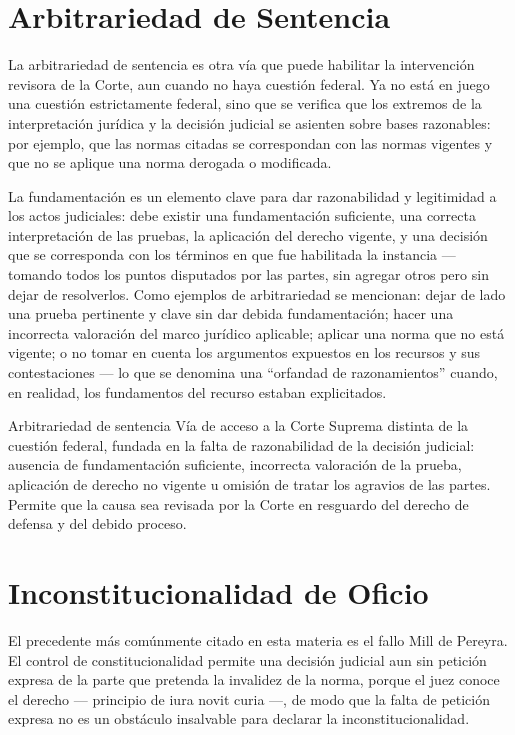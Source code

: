 \documentclass[12pt,oneside]{book}
\begin{document}
\section{Arbitrariedad de Sentencia}

La arbitrariedad de sentencia es otra vía que puede habilitar la intervención revisora de la Corte, aun cuando no haya cuestión federal. Ya no está en juego una cuestión estrictamente federal, sino que se verifica que los extremos de la interpretación jurídica y la decisión judicial se asienten sobre bases razonables: por ejemplo, que las normas citadas se correspondan con las normas vigentes y que no se aplique una norma derogada o modificada.

La fundamentación es un elemento clave para dar razonabilidad y legitimidad a los actos judiciales: debe existir una fundamentación suficiente, una correcta interpretación de las pruebas, la aplicación del derecho vigente, y una decisión que se corresponda con los términos en que fue habilitada la instancia --- tomando todos los puntos disputados por las partes, sin agregar otros pero sin dejar de resolverlos. Como ejemplos de arbitrariedad se mencionan: dejar de lado una prueba pertinente y clave sin dar debida fundamentación; hacer una incorrecta valoración del marco jurídico aplicable; aplicar una norma que no está vigente; o no tomar en cuenta los argumentos expuestos en los recursos y sus contestaciones --- lo que se denomina una ``orfandad de razonamientos'' cuando, en realidad, los fundamentos del recurso estaban explicitados.

\begin{definition}{Arbitrariedad de sentencia}
Vía de acceso a la Corte Suprema distinta de la cuestión federal, fundada en la falta de razonabilidad de la decisión judicial: ausencia de fundamentación suficiente, incorrecta valoración de la prueba, aplicación de derecho no vigente u omisión de tratar los agravios de las partes. Permite que la causa sea revisada por la Corte en resguardo del derecho de defensa y del debido proceso.
\end{definition}

\section{Inconstitucionalidad de Oficio}

El precedente más comúnmente citado en esta materia es el fallo Mill de Pereyra. El control de constitucionalidad permite una decisión judicial aun sin petición expresa de la parte que pretenda la invalidez de la norma, porque el juez conoce el derecho --- principio de iura novit curia ---, de modo que la falta de petición expresa no es un obstáculo insalvable para declarar la inconstitucionalidad.
\end{document}
